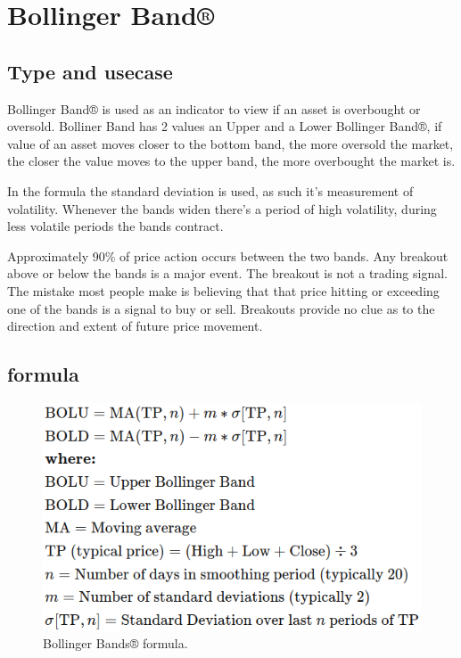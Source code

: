\documentclass[12pt,a4paper]{article}
\begin{document}
\section{Bollinger Band®}

\subsection{Type and usecase}
Bollinger Band® is used as an indicator to view if an asset is overbought or oversold. Bolliner Band has 2 values an Upper and a Lower Bollinger Band®, if value of an asset moves closer to the bottom band, the more oversold the market, the closer the value moves to the upper band, the more overbought the market is.

In the formula the standard deviation is used, as such it's measurement of volatility. Whenever the bands widen there's a period of high volatility, during less volatile periods the bands contract.

Approximately 90\% of price action occurs between the two bands. Any breakout above or below the bands is a major event. The breakout is not a trading signal. The mistake most people make is believing that that price hitting or exceeding one of the bands is a signal to buy or sell. Breakouts provide no clue as to the direction and extent of future price movement.

\subsection{formula}

\begin{figure}[H]
    \includegraphics[scale=0.7]{../images/BollingerBands.png}
    \caption{Bollinger Bands® formula.}
    \label{fig:BollingerBands}
\end{figure}
\end{document}
